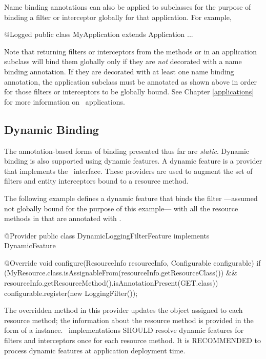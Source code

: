 Name binding annotations can also be applied to  subclasses for the purpose of binding a filter or interceptor globally for that application. For example,

\begin{listing}{1}
@Logged
public class MyApplication extends Application {
    ...
}
\end{listing}

Note that returning filters or interceptors from the methods  or  in an application subclass will bind them globally only if they are \emph{not} decorated with a name binding annotation. If they are decorated with at least one name binding annotation, the application subclass must be annotated as shown above in order for those filters or interceptors to be globally bound. See Chapter \ref{applications} for more information on \jaxrs\ applications.

\subsection{Dynamic Binding}
\label{dynamic_binding}

The annotation-based forms of binding presented thus far are {\em static}. Dynamic binding is also supported using dynamic features. A dynamic feature is a provider that implements the \DynamicFeature\ interface. These providers are used to augment the set of filters and entity interceptors bound to a resource method. 

The following example defines a dynamic feature that binds the filter  ---assumed not globally bound for the purpose of this example--- with all the resource methods in  that are annotated with .

\begin{listing}{1}
@Provider
public class DynamicLoggingFilterFeature implements DynamicFeature {

  @Override
  void configure(ResourceInfo resourceInfo, Configurable configurable) {
    if (MyResource.class.isAssignableFrom(resourceInfo.getResourceClass())
      && resourceInfo.getResourceMethod().isAnnotationPresent(GET.class)) {
      configurable.register(new LoggingFilter());
    }
  }
}

\end{listing}

The overridden method in this provider updates the  object assigned to each resource method; the information about the resource method is provided in the form of a  instance.
\jaxrs\ implementations SHOULD resolve dynamic features for filters and interceptors once for each resource method. It is RECOMMENDED to process dynamic features at application deployment time.

